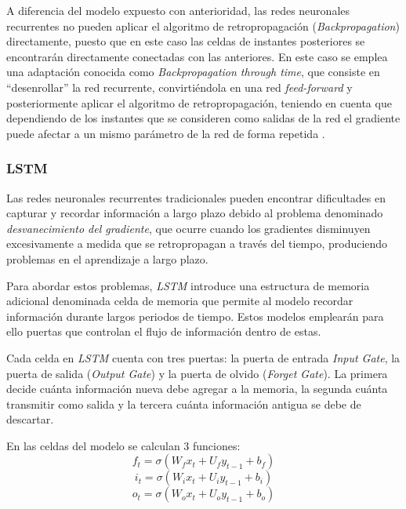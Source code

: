 A diferencia del modelo expuesto con anterioridad, las redes neuronales recurrentes no pueden aplicar el algoritmo de retropropagación (\textit{Backpropagation})
directamente, puesto que en este caso las celdas de instantes posteriores se encontrarán directamente conectadas con las anteriores.
En este caso se emplea una adaptación conocida como \textit{Backpropagation through time}, que consiste en ``desenrollar'' la red recurrente, convirtiéndola
en una red \textit{feed-forward} y posteriormente aplicar el algoritmo de retropropagación, teniendo en cuenta que dependiendo de los instantes 
que se consideren como salidas de la red el gradiente puede afectar a un mismo parámetro de la red de forma repetida \cite{book:rue2019}.

\subsubsection{LSTM}
Las redes neuronales recurrentes tradicionales pueden encontrar dificultades en capturar y recordar información
a largo plazo debido al problema denominado \textit{desvanecimiento del gradiente}, que ocurre
cuando los gradientes disminuyen excesivamente a medida que se retropropagan a través
del tiempo, produciendo problemas en el aprendizaje a largo plazo.

Para abordar estos problemas, \textit{LSTM} introduce una estructura de memoria adicional denominada
celda de memoria que permite al modelo recordar información durante largos periodos de tiempo. Estos 
modelos emplearán para ello puertas que controlan el flujo de información dentro de estas.

Cada celda en \textit{LSTM} cuenta con tres puertas: la puerta de entrada \textit{Input Gate}, la puerta de salida 
(\textit{Output Gate}) y la puerta de olvido (\textit{Forget Gate}). La primera decide
cuánta información nueva debe agregar a la memoria, la segunda cuánta transmitir como salida y 
la tercera cuánta información antigua se debe de descartar.

En las celdas del modelo se calculan 3 funciones:
\begin{equation}
    f_t = \sigma (W_{f} x_t + U_{f} y_{t-1} + b_f)
\end{equation}
\begin{equation}
    i_t = \sigma (W_{i} x_t + U_{i} y_{t-1} + b_i)
\end{equation}
\begin{equation}    
    o_t = \sigma (W_{o} x_t + U_{o} y_{t-1} + b_o)
\end{equation}

